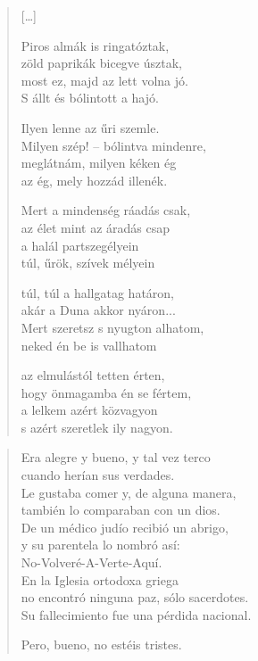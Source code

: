 \documentclass[11pt]{extbook}
\newcommand*{\centeredornament}{\centerline{\pgfornament[width=6cm]{88}}}
\begin{document}
\begin{verse}
  \textnormal{[\ldots]}

  Piros almák is ringatóztak, \\
  zöld paprikák bicegve úsztak, \\
  most ez, majd az lett volna jó. \\
  S állt és bólintott a hajó.

  Ilyen lenne az űri szemle. \\
  Milyen szép! -- bólintva mindenre, \\
  meglátnám, milyen kéken ég \\
  az ég, mely hozzád illenék.

  Mert a mindenség ráadás csak, \\
  az élet mint az áradás csap \\
  a halál partszegélyein \\
  túl, űrök, szívek mélyein

  túl, túl a hallgatag határon, \\
  akár a Duna akkor nyáron... \\
  Mert szeretsz s nyugton alhatom, \\
  neked én be is vallhatom

  az elmulástól tetten érten, \\
  hogy önmagamba én se fértem, \\
  a lelkem azért közvagyon \\
  s azért szeretlek ily nagyon.
\end{verse}

\newpage


\vspace*{-15mm}
\centeredornament



\begin{verse}
  Era alegre y bueno, y tal vez terco \\
  cuando herían sus verdades. \\
  Le gustaba comer y, de alguna manera, \\
  también lo comparaban con un dios. \\
  De un médico judío recibió un abrigo, \\
  y su parentela lo nombró así: \\
  No-Volveré-A-Verte-Aquí. \\
  En la Iglesia ortodoxa griega \\
  no encontró ninguna paz, sólo sacerdotes. \\
  Su fallecimiento fue una pérdida nacional.

  Pero, bueno, no estéis tristes.
\end{verse}
\end{document}
